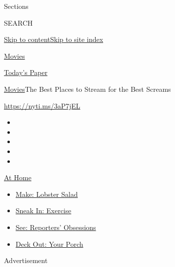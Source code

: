 Sections

SEARCH

\protect\hyperlink{site-content}{Skip to
content}\protect\hyperlink{site-index}{Skip to site index}

\href{https://www.nytimes3xbfgragh.onion/section/movies}{Movies}

\href{https://myaccount.nytimes3xbfgragh.onion/auth/login?response_type=cookie\&client_id=vi}{}

\href{https://www.nytimes3xbfgragh.onion/section/todayspaper}{Today's
Paper}

\href{/section/movies}{Movies}\textbar{}The Best Places to Stream for
the Best Screams

\url{https://nyti.ms/3aP7jEL}

\begin{itemize}
\item
\item
\item
\item
\item
\end{itemize}

\href{https://www.nytimes3xbfgragh.onion/spotlight/at-home?action=click\&pgtype=Article\&state=default\&region=TOP_BANNER\&context=at_home_menu}{At
Home}

\begin{itemize}
\tightlist
\item
  \href{https://www.nytimes3xbfgragh.onion/2020/08/14/dining/lobster-salad-recipe.html?action=click\&pgtype=Article\&state=default\&region=TOP_BANNER\&context=at_home_menu}{Make:
  Lobster Salad}
\item
  \href{https://www.nytimes3xbfgragh.onion/2020/08/15/at-home/coronavirus-at-home-quick-exercises.html?action=click\&pgtype=Article\&state=default\&region=TOP_BANNER\&context=at_home_menu}{Sneak
  In: Exercise}
\item
  \href{https://www.nytimes3xbfgragh.onion/interactive/2020/at-home/even-more-reporters-editors-diaries-lists-recommendations.html?action=click\&pgtype=Article\&state=default\&region=TOP_BANNER\&context=at_home_menu}{See:
  Reporters' Obsessions}
\item
  \href{https://www.nytimes3xbfgragh.onion/2020/08/15/at-home/coronavirus-fall-patio-furniture.html?action=click\&pgtype=Article\&state=default\&region=TOP_BANNER\&context=at_home_menu}{Deck
  Out: Your Porch}
\end{itemize}

Advertisement


